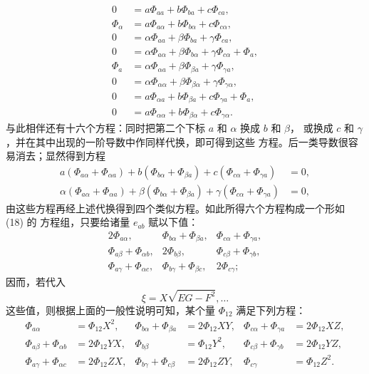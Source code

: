 \documentclass[11pt,a4paper,leqno]{article}
\begin{document}
\begin{equation}\tag{19}
\begin{aligned}
0&=a\Phi_{aa}+b\Phi_{ba}+c\Phi_{ca},\\
\Phi_\alpha&=a\Phi_{a\alpha}+b\Phi_{b\alpha}+c\Phi_{c\alpha},\\
0&=\alpha\Phi_{aa}+\beta\Phi_{ba}+\gamma\Phi_{ca},\\
0&=\alpha\Phi_{a\alpha}+\beta\Phi_{b\alpha}+\gamma\Phi_{c\alpha}+\Phi_a,\\
\Phi_a&=\alpha\Phi_{\alpha a}+\beta\Phi_{\beta a}+\gamma\Phi_{\gamma a},\\
0&=\alpha\Phi_{\alpha\alpha}+\beta\Phi_{\beta\alpha}+\gamma\Phi_{\gamma\alpha},\\
0&=a\Phi_{\alpha a}+b\Phi_{\beta a}+c\Phi_{\gamma a}+\Phi_a,\\
0&=a\Phi_{\alpha\alpha}+b\Phi_{\beta\alpha}+c\Phi_{\gamma\alpha}.
\end{aligned}
\end{equation}
与此相伴还有十六个方程：同时把第二个下标 $a$ 和 $\alpha$ 换成 $b$ 和 $\beta$，
或换成 $c$ 和 $\gamma$，并在其中出现的一阶导数中作同样代换，即可得到这些
方程。后一类导数很容易消去；显然得到方程
\[
\begin{aligned}
a(\Phi_{a\alpha}+\Phi_{\alpha a})
+b(\Phi_{b\alpha}+\Phi_{\beta a})
+c(\Phi_{c\alpha}+\Phi_{\gamma a})&=0,\\
\alpha(\Phi_{a\alpha}+\Phi_{\alpha a})
+\beta(\Phi_{b\alpha}+\Phi_{\beta a})
+\gamma(\Phi_{c\alpha}+\Phi_{\gamma a})&=0,
\end{aligned}
\]
由这些方程再经上述代换得到四个类似方程。如此所得六个方程构成一个形如 (18) 的
方程组，只要给诸量 $e_{ab}$ 赋以下值：
\[
\begin{array}{ccc}
2\Phi_{a\alpha},&\Phi_{b\alpha}+\Phi_{\beta a},&\Phi_{c\alpha}+\Phi_{\gamma a},\\
\Phi_{a\beta}+\Phi_{\alpha b},&2\Phi_{b\beta},&\Phi_{c\beta}+\Phi_{\gamma b},\\
\Phi_{a\gamma}+\Phi_{\alpha c},&\Phi_{b\gamma}+\Phi_{\beta c},&2\Phi_{c\gamma};
\end{array}
\]
因而，若代入
\[
\xi=X\sqrt{EG-F^2},\ldots
\]
这些值，则根据上面的一般性说明可知，某个量 $\Phi_{12}$ 满足下列方程：
\[
\begin{aligned}
\Phi_{a\alpha}&=\Phi_{12}X^2,
&\Phi_{b\alpha}+\Phi_{\beta a}&=2\Phi_{12}XY,
&\Phi_{c\alpha}+\Phi_{\gamma a}&=2\Phi_{12}XZ,\\
\Phi_{a\beta}+\Phi_{\alpha b}&=2\Phi_{12}YX,
&\Phi_{b\beta}&=\Phi_{12}Y^2,
&\Phi_{c\beta}+\Phi_{\gamma b}&=2\Phi_{12}YZ,\\
\Phi_{a\gamma}+\Phi_{\alpha c}&=2\Phi_{12}ZX,
&\Phi_{b\gamma}+\Phi_{c\beta}&=2\Phi_{12}ZY,
&\Phi_{c\gamma}&=\Phi_{12}Z^2.
\end{aligned}
\]
\end{document}
